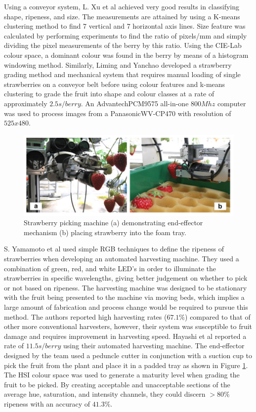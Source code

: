 \documentclass[fleqn,twoside,12pt]{report}
\begin{document}
Using a conveyor system, L. Xu et al \cite{xu} achieved very good results in classifying shape, ripeness, and size. The measurements are attained by using a K-means clustering method to find 7 vertical and 7 horizontal axis lines. Size feature was calculated by performing experiments to find the ratio of pixels/mm and simply dividing the pixel measurements of the berry by this ratio. Using the CIE-Lab colour space, a dominant colour was found in the berry by means of a histogram windowing method. Similarly, Liming and Yanchao \cite{liming} developed a strawberry grading method and mechanical system that requires manual loading of single strawberries on a conveyor belt before using colour features and k-means clustering to grade the fruit into shape and colour classes at a rate of approximately $2.5s/berry$. An Advantech\texttrademark PCM9575 all-in-one $800Mhz$ computer was used to process images from a Panasonic\texttrademark WV-CP470 with resolution of $525x480$. 


\begin{figure}[h]
	\centering
	\includegraphics[width=0.9\linewidth]{strawberry_picker.png}
	\caption{Strawberry picking machine (a) demonstrating end-effector mechanism (b) placing strawberry into the foam tray.}
	\label{fig:strawberry_picker}
\end{figure}%


S. Yamamoto et al \cite{yamamoto2} used simple RGB techniques to define the ripeness of strawberries when developing an automated harvesting machine. They used a combination of green, red, and white LED's in order to illuminate the strawberries in specific wavelengths, giving better judgement on whether to pick or not based on ripeness. The harvesting machine was designed to be stationary with the fruit being presented to the machine via moving beds, which implies a large amount of fabrication and process change would be required to pursue this method. The authors reported high harvesting rates ($67.1\%$) compared to that of other more conventional harvesters, however, their system was susceptible to fruit damage and requires improvement in harvesting speed. Hayashi et al \cite{hayashi} reported a rate of $11.5s/berry$ using their automated harvesting machine. The end-effector designed by the team used a peduncle cutter in conjunction with a suction cup to pick the fruit from the plant and place it in a padded tray as shown in Figure \ref{fig:strawberry_picker}. The HSI colour space was used to generate a maturity level when grading the fruit to be picked. By creating acceptable and unacceptable sections of the average hue, saturation, and intensity channels, they could discern $>80\%$ ripeness with an accuracy of $41.3\%$.
\end{document}
